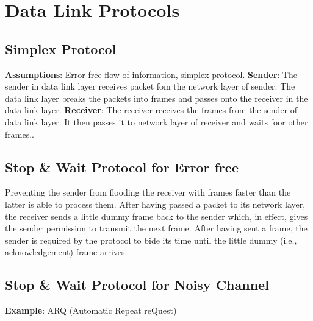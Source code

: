 \documentclass[a4paper,oneside]{book}
\begin{document}
\section{Data Link Protocols}
\subsection{Simplex Protocol}
\textbf{Assumptions}: Error free flow of information, simplex protocol.
\textbf{Sender}: The sender in data link layer receives packet fom the network layer of sender. The data link layer breaks the packets into frames and passes onto the receiver in the data link layer.
\textbf{Receiver}: The receiver receives the frames from the sender of data link layer. It then passes it to network layer of receiver and waits foor other frames..
\subsection{Stop \& Wait Protocol for Error free}
Preventing the sender from flooding the receiver with frames faster than the latter is able to process them. After having passed a packet to its network layer, the receiver sends a little dummy frame back to the sender which, in effect, gives the sender permission to transmit the next frame. After having sent a frame, the sender is required by the protocol to bide its time until the little dummy (i.e., acknowledgement) frame arrives.
\subsection{Stop \& Wait Protocol for Noisy Channel}
\textbf{Example}: ARQ (Automatic Repeat reQuest)
\end{document}
